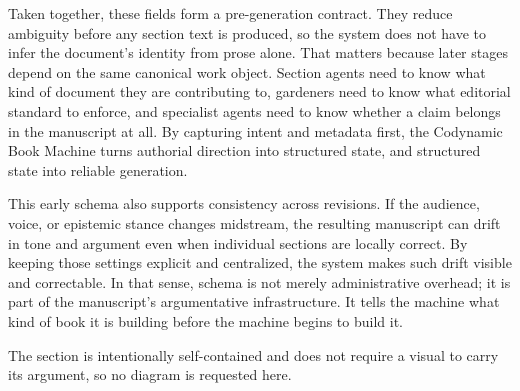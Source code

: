 \documentclass[11pt]{article}
\begin{document}
Taken together, these fields form a pre-generation contract. They reduce ambiguity before any section text is produced, so the system does not have to infer the document's identity from prose alone. That matters because later stages depend on the same canonical work object. Section agents need to know what kind of document they are contributing to, gardeners need to know what editorial standard to enforce, and specialist agents need to know whether a claim belongs in the manuscript at all. By capturing intent and metadata first, the Codynamic Book Machine turns authorial direction into structured state, and structured state into reliable generation.

This early schema also supports consistency across revisions. If the audience, voice, or epistemic stance changes midstream, the resulting manuscript can drift in tone and argument even when individual sections are locally correct. By keeping those settings explicit and centralized, the system makes such drift visible and correctable. In that sense, schema is not merely administrative overhead; it is part of the manuscript's argumentative infrastructure. It tells the machine what kind of book it is building before the machine begins to build it.

The section is intentionally self-contained and does not require a visual to carry its argument, so no diagram is requested here.
\end{document}
